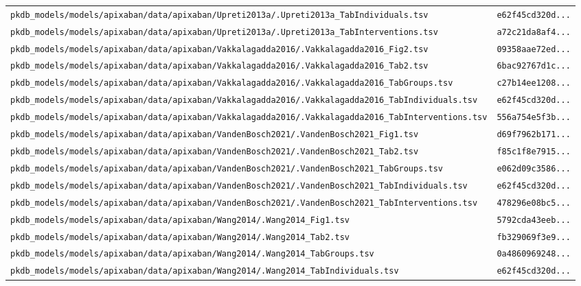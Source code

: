 \begin{longtable}{ll}
\texttt{pkdb\_models/models/apixaban/data/apixaban/Upreti2013a/.Upreti2013a\_TabIndividuals.tsv} & \texttt{e62f45cd320d...} \\
\texttt{pkdb\_models/models/apixaban/data/apixaban/Upreti2013a/.Upreti2013a\_TabInterventions.tsv} & \texttt{a72c21da8af4...} \\
\texttt{pkdb\_models/models/apixaban/data/apixaban/Vakkalagadda2016/.Vakkalagadda2016\_Fig2.tsv} & \texttt{09358aae72ed...} \\
\texttt{pkdb\_models/models/apixaban/data/apixaban/Vakkalagadda2016/.Vakkalagadda2016\_Tab2.tsv} & \texttt{6bac92767d1c...} \\
\texttt{pkdb\_models/models/apixaban/data/apixaban/Vakkalagadda2016/.Vakkalagadda2016\_TabGroups.tsv} & \texttt{c27b14ee1208...} \\
\texttt{pkdb\_models/models/apixaban/data/apixaban/Vakkalagadda2016/.Vakkalagadda2016\_TabIndividuals.tsv} & \texttt{e62f45cd320d...} \\
\texttt{pkdb\_models/models/apixaban/data/apixaban/Vakkalagadda2016/.Vakkalagadda2016\_TabInterventions.tsv} & \texttt{556a754e5f3b...} \\
\texttt{pkdb\_models/models/apixaban/data/apixaban/VandenBosch2021/.VandenBosch2021\_Fig1.tsv} & \texttt{d69f7962b171...} \\
\texttt{pkdb\_models/models/apixaban/data/apixaban/VandenBosch2021/.VandenBosch2021\_Tab2.tsv} & \texttt{f85c1f8e7915...} \\
\texttt{pkdb\_models/models/apixaban/data/apixaban/VandenBosch2021/.VandenBosch2021\_TabGroups.tsv} & \texttt{e062d09c3586...} \\
\texttt{pkdb\_models/models/apixaban/data/apixaban/VandenBosch2021/.VandenBosch2021\_TabIndividuals.tsv} & \texttt{e62f45cd320d...} \\
\texttt{pkdb\_models/models/apixaban/data/apixaban/VandenBosch2021/.VandenBosch2021\_TabInterventions.tsv} & \texttt{478296e08bc5...} \\
\texttt{pkdb\_models/models/apixaban/data/apixaban/Wang2014/.Wang2014\_Fig1.tsv} & \texttt{5792cda43eeb...} \\
\texttt{pkdb\_models/models/apixaban/data/apixaban/Wang2014/.Wang2014\_Tab2.tsv} & \texttt{fb329069f3e9...} \\
\texttt{pkdb\_models/models/apixaban/data/apixaban/Wang2014/.Wang2014\_TabGroups.tsv} & \texttt{0a4860969248...} \\
\texttt{pkdb\_models/models/apixaban/data/apixaban/Wang2014/.Wang2014\_TabIndividuals.tsv} & \texttt{e62f45cd320d...} \\

\end{longtable}
